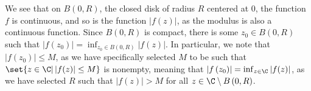\documentclass[10pt]{mypackage}
\begin{document}
\begin{solution}
\begin{enumerate}[(a)]
      We see that on $B\left( 0,R \right)$, the closed disk of radius $R$ centered at $0$, the function $f$ is continuous, and so is the function $\left\vert f(z) \right\vert$, as the modulus is also a continuous function. Since $B(0,R)$ is compact, there is some $z_0\in B\left( 0,R \right)$ such that $\left\vert f\left(z_0\right) \right\vert = \inf_{z_0\in B\left( 0,R \right)}\left\vert f(z) \right\vert$. In particular, we note that $\left\vert f\left(z_0\right) \right\vert \leq M$, as we have specifically selected $M$ to be such that $\set{z\in \C | \left\vert f(z) \right\vert \leq M}$ is nonempty, meaning that $\left\vert f\left( z_0 \right) \right\vert = \inf_{z\in \C} \left\vert f(z) \right\vert$, as we have selected $R$ such that $ \left\vert f(z) \right\vert > M $ for all $z \in \C\setminus B\left( 0,R \right)$.
  \end{enumerate}
\end{solution}
\end{document}
